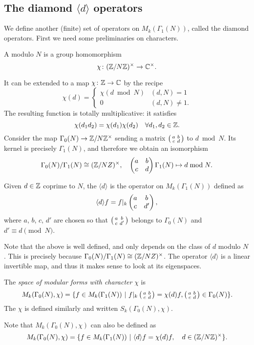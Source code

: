 \subsection{The diamond \texorpdfstring{$\langle d \rangle$}{d} operators}

We define another (finite) set of operators on $M_k(\Gamma_1(N))$, called the diamond operators. First we need some preliminaries on characters.
\begin{definition}
  A  modulo $N$ is a group homomorphism
\[
\chi\colon (\mathbb{Z}/N\mathbb{Z})^\times\to\mathbb{C}^\times.
\]
\end{definition}
It can be extended to a map $\chi\colon \mathbb{Z}\to \mathbb{C}$ by the recipe
\[
\chi(d) = \begin{cases}
\chi(d\bmod N)&(d,N)=1\\
0&(d,N)\neq 1.
\end{cases}
\]
The resulting function is totally multiplicative: it satisfies
\[
\chi(d_1d_2)=\chi(d_1)\chi(d_2)\quad \forall d_1,d_2\in\mathbb{Z}.
\]
Consider the map $\Gamma_0(N)\to\mathbb{Z}/N\mathbb{Z}^\times$ sending a matrix $\left(\begin{smallmatrix}a&b\\c&d\end{smallmatrix}\right)$ to $d\bmod N$. Its kernel is precisely $\Gamma_1(N)$, and therefore we obtain an isomorphism
\[
\Gamma_0(N)/\Gamma_1(N)\cong (\mathbb{Z}/NZ)^\times,\quad \left(\begin{matrix}a&b\\c&d\end{matrix}\right) \Gamma_1(N)\mapsto d\bmod N.
\]

\begin{definition}
Given $d\in \mathbb{Z}$ coprime to $N$, the  $\langle d\rangle$ is the operator on $M_k(\Gamma_1(N))$ defined as
\[
\langle d \rangle f = f|_k \left(\begin{matrix}a&b\\c&d'\end{matrix}\right),
\]
where $a$, $b$, $c$, $d'$ are chosen so that $\left(\begin{smallmatrix}a&b\\c&d'\end{smallmatrix}\right)$ belongs to $\Gamma_0(N)$ and $d'\equiv d\pmod N$. 
\end{definition}
Note that the above is well defined, and only depends on the class of $d$ modulo $N$. This is precisely because $\Gamma_0(N)/\Gamma_1(N)\cong (\mathbb{Z}/NZ)^\times$. The operator $\langle d\rangle$ is a linear invertible map, and thus it makes sense to look at its eigenspaces.

\begin{definition}
  The \emph{space of modular forms with character} $\chi$ is
\[
M_k(\Gamma_0(N),\chi)=\{f\in M_k(\Gamma_1(N))~|~ f|_k\left(\begin{smallmatrix}a&b\\c&d\end{smallmatrix}\right) = \chi(d) f,\left(\begin{smallmatrix}a&b\\c&d\end{smallmatrix}\right)\in \Gamma_0(N)\}.
\]
The  $\chi$ is defined similarly and written $S_k(\Gamma_0(N),\chi)$.
\end{definition}

Note that $M_k(\Gamma_0(N),\chi)$ can also be defined as
\[
M_k(\Gamma_0(N),\chi)=\{f\in M_k(\Gamma_1(N))~|~ \langle d\rangle f = \chi(d) f,\quad d\in (\mathbb{Z}/N\mathbb{Z})^\times\}.
\]

